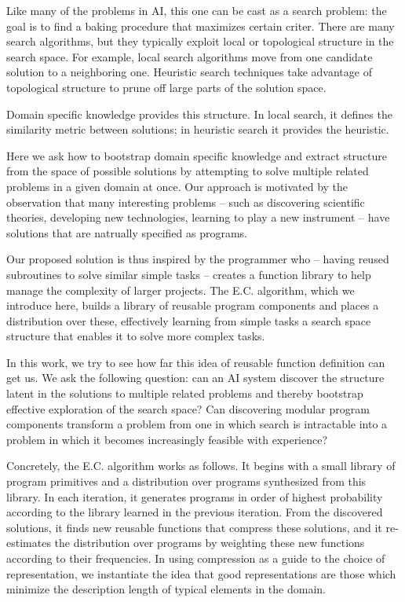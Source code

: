 \documentclass{article}
\begin{document}
Like many of the problems in AI, this one can be cast as a search
problem: the goal is to find a baking procedure that maximizes certain
criter.  There are many search algorithms, but they typically exploit
local or topological structure in the search space. For example, local
search algorithms move from one candidate solution to a neighboring
one. Heuristic search techniques take advantage of topological
structure to prune off large parts of the solution space.

Domain specific knowledge provides this structure. In local search, it
defines the similarity metric between solutions; in heuristic search
it provides the heuristic.  

Here we ask how to bootstrap domain specific knowledge and extract
structure from the space of possible solutions by attempting to solve
multiple related problems in a given domain at once. Our approach is
motivated by the observation that many interesting problems -- such as
discovering scientific theories, developing new technologies, learning
to play a new instrument -- have solutions that are natrually
specified as programs.

Our proposed solution is thus inspired by the programmer who -- having
reused subroutines to solve similar simple tasks -- creates a function
library to help manage the complexity of larger projects. The
E.C. algorithm, which we introduce here, builds a library of reusable
program components and places a distribution over these, effectively
learning from simple tasks a search space structure that enables it to
solve more complex tasks.

In this work, we try to see how far this idea of reusable function
definition can get us. We ask the following question: can an AI system
discover the structure latent in the solutions to multiple related
problems and thereby bootstrap effective exploration of the search
space? Can discovering modular program components transform a problem
from one in which search is intractable into a problem in which it
becomes increasingly feasible with experience?

Concretely, the E.C. algorithm works as follows. It begins with a small
library of program primitives and a distribution over programs
synthesized from this library. In each iteration, it generates
programs in order of highest probability according to the library
learned in the previous iteration. From the discovered solutions, it
finds new reusable functions that compress these solutions, and it
re-estimates the distribution over programs by weighting these new
functions according to their frequencies. In using compression as a
guide to the choice of representation, we instantiate the idea that
good representations are those which minimize the description length
of typical elements in the domain.
\end{document}
